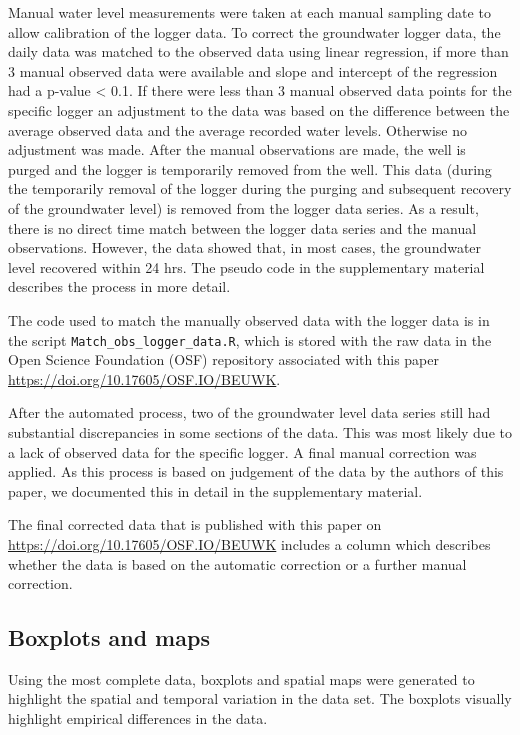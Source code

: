 \documentclass[, manuscript]{copernicus}
\begin{document}
Manual water level measurements were taken at each manual sampling date
to allow calibration of the logger data. To correct the groundwater
logger data, the daily data was matched to the observed data using
linear regression, if more than 3 manual observed data were available
and slope and intercept of the regression had a p-value \textless{} 0.1.
If there were less than 3 manual observed data points for the specific
logger an adjustment to the data was based on the difference between the
average observed data and the average recorded water levels. Otherwise
no adjustment was made. After the manual observations are made, the well
is purged and the logger is temporarily removed from the well. This data
(during the temporarily removal of the logger during the purging and
subsequent recovery of the groundwater level) is removed from the logger
data series. As a result, there is no direct time match between the
logger data series and the manual observations. However, the data showed
that, in most cases, the groundwater level recovered within 24 hrs. The
pseudo code in the supplementary material describes the process in more
detail.

The code used to match the manually observed data with the logger data
is in the script \texttt{Match\_obs\_logger\_data.R}, which is stored
with the raw data in the Open Science Foundation (OSF) repository
associated with this paper \url{https://doi.org/10.17605/OSF.IO/BEUWK}.

After the automated process, two of the groundwater level data series
still had substantial discrepancies in some sections of the data. This
was most likely due to a lack of observed data for the specific logger.
A final manual correction was applied. As this process is based on
judgement of the data by the authors of this paper, we documented this
in detail in the supplementary material.

The final corrected data that is published with this paper on
\url{https://doi.org/10.17605/OSF.IO/BEUWK} includes a column which
describes whether the data is based on the automatic correction or a
further manual correction.

\clearpage

\subsection{Boxplots and maps}

Using the most complete data, boxplots and spatial maps were generated
to highlight the spatial and temporal variation in the data set. The
boxplots visually highlight empirical differences in the data.
\end{document}
